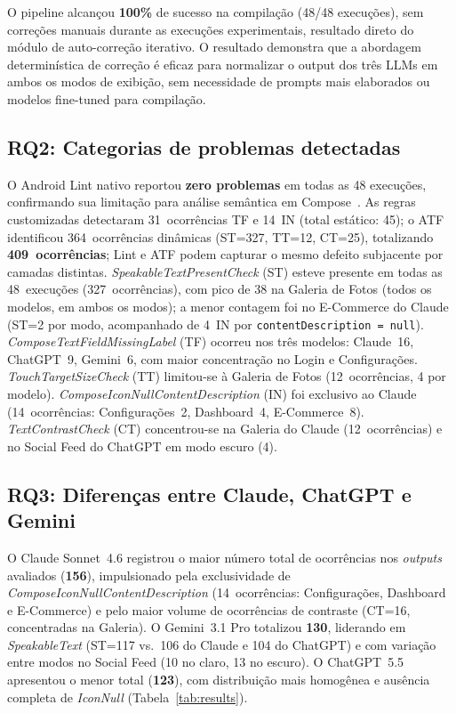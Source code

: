 \documentclass[sigconf,review]{webmedia}
\begin{document}
O pipeline alcançou \textbf{100\%} de sucesso na compilação (48/48 execuções),
sem correções manuais durante as execuções experimentais, resultado direto
do módulo de auto-correção iterativo. O resultado demonstra que a abordagem
determinística de correção é eficaz para normalizar o output dos três LLMs
em ambos os modos de exibição, sem necessidade de prompts mais elaborados
ou modelos fine-tuned para compilação.

\subsection{RQ2: Categorias de problemas detectadas}

O Android Lint nativo reportou \textbf{zero problemas} em todas as 48
execuções, confirmando sua limitação para análise semântica em
Compose~\cite{google2024composeaccessibility}. As regras customizadas
detectaram 31~ocorrências TF e 14~IN (total estático: 45); o ATF
identificou 364~ocorrências dinâmicas (ST=327, TT=12, CT=25), totalizando
\textbf{409~ocorrências}; Lint e ATF podem capturar o mesmo defeito
subjacente por camadas distintas.
\textit{SpeakableTextPresentCheck} (ST) esteve presente em todas as
48~execuções (327~ocorrências), com pico de 38 na Galeria de Fotos
(todos os modelos, em ambos os modos); a menor contagem foi no E-Commerce
do Claude (ST=2 por modo, acompanhado de 4~IN por
\texttt{contentDescription\,=\,null}).
\textit{ComposeTextFieldMissingLabel} (TF) ocorreu nos três modelos:
Claude~16, ChatGPT~9, Gemini~6, com maior concentração no Login e
Configurações.
\textit{TouchTargetSizeCheck} (TT) limitou-se à Galeria de Fotos
(12~ocorrências, 4 por modelo).
\textit{ComposeIconNullContentDescription} (IN) foi exclusivo ao Claude
(14~ocorrências: Configurações~2, Dashboard~4, E-Commerce~8).
\textit{TextContrastCheck} (CT) concentrou-se na Galeria do Claude
(12~ocorrências) e no Social Feed do ChatGPT em modo escuro (4).

\subsection{RQ3: Diferenças entre Claude, ChatGPT e Gemini}

O Claude Sonnet~4.6 registrou o maior número total de ocorrências nos
\textit{outputs} avaliados (\textbf{156}), impulsionado pela exclusividade
de \textit{ComposeIconNullContentDescription} (14~ocorrências: Configurações,
Dashboard e E-Commerce) e pelo maior volume de ocorrências de contraste
(CT=16, concentradas na Galeria). O Gemini~3.1 Pro totalizou \textbf{130},
liderando em \textit{SpeakableText} (ST=117 vs.\ 106 do Claude e 104 do
ChatGPT) e com variação entre modos no Social Feed (10 no claro,
13 no escuro). O ChatGPT~5.5 apresentou o menor total (\textbf{123}), com
distribuição mais homogênea e ausência completa de \textit{IconNull}
(Tabela~\ref{tab:results}).
\end{document}
